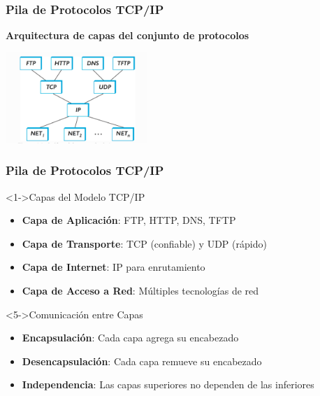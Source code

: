 \documentclass[aspectratio=169]{beamer}
\begin{document}
      \begin{frame}
      \frametitle{Pila de Protocolos TCP/IP}
      
      \begin{center}
      \Large \textbf{Arquitectura de capas del conjunto de protocolos}
      \end{center}
      
      \begin{center}
      \includegraphics[width=0.4\textwidth]{figuras/image8.png}
      \end{center}
      \end{frame}
      
      \begin{frame}
          \frametitle{Pila de Protocolos TCP/IP}
      
      \begin{block}<1->{Capas del Modelo TCP/IP}
      \begin{itemize}
      \item<1-> \textbf{Capa de Aplicación}: FTP, HTTP, DNS, TFTP
      \item<2-> \textbf{Capa de Transporte}: TCP (confiable) y UDP (rápido)
      \item<3-> \textbf{Capa de Internet}: IP para enrutamiento
      \item<4-> \textbf{Capa de Acceso a Red}: Múltiples tecnologías de red
      \end{itemize}
      \end{block}
      
      \begin{block}<5->{Comunicación entre Capas}
      \begin{itemize}
      \item<5-> \textbf{Encapsulación}: Cada capa agrega su encabezado
      \item<6-> \textbf{Desencapsulación}: Cada capa remueve su encabezado
      \item<7-> \textbf{Independencia}: Las capas superiores no dependen de las inferiores
      \end{itemize}
      \end{block}
      \end{frame}
      
\end{document}
